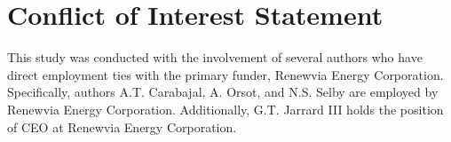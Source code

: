 \section*{Conflict of Interest Statement}
This study was conducted with the involvement of several authors who have direct employment ties with the primary funder, Renewvia Energy Corporation. Specifically, authors A.T. Carabajal, A. Orsot, and N.S. Selby are employed by Renewvia Energy Corporation. Additionally, G.T. Jarrard III holds the position of CEO at Renewvia Energy Corporation.